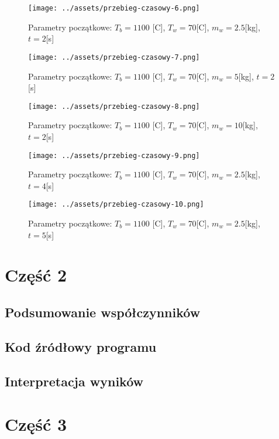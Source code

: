 \documentclass[
	12pt, %
]{fphw}
\begin{document}
\begin{figure}[H]
	\texttt{[image: ../assets/przebieg-czasowy-6.png]}
	\caption{Parametry początkowe: \(T_b = 1100\) [\textdegree{}C], \(T_w = 70\)[\textdegree{}C], \(m_w = 2.5\)[kg], \(t = 2\)[s]}
\end{figure}

\begin{figure}[H]
	\texttt{[image: ../assets/przebieg-czasowy-7.png]}
	\caption{Parametry początkowe: \(T_b = 1100\) [\textdegree{}C], \(T_w = 70\)[\textdegree{}C], \(m_w = 5\)[kg], \(t = 2\)[s]}
\end{figure}

\begin{figure}[H]
	\texttt{[image: ../assets/przebieg-czasowy-8.png]}
	\caption{Parametry początkowe: \(T_b = 1100\) [\textdegree{}C], \(T_w = 70\)[\textdegree{}C], \(m_w = 10\)[kg], \(t = 2\)[s]}
\end{figure}

\begin{figure}[H]
	\texttt{[image: ../assets/przebieg-czasowy-9.png]}
	\caption{Parametry początkowe: \(T_b = 1100\) [\textdegree{}C], \(T_w = 70\)[\textdegree{}C], \(m_w = 2.5\)[kg], \(t = 4\)[s]}
\end{figure}

\begin{figure}[H]
	\texttt{[image: ../assets/przebieg-czasowy-10.png]}
	\caption{Parametry początkowe: \(T_b = 1100\) [\textdegree{}C], \(T_w = 70\)[\textdegree{}C], \(m_w = 2.5\)[kg], \(t = 5\)[s]}
\end{figure}


\section{Część 2}
\subsection{Podsumowanie współczynników}
\subsection{Kod źródłowy programu}
\subsection{Interpretacja wyników}
\section{Część 3}
\end{document}
